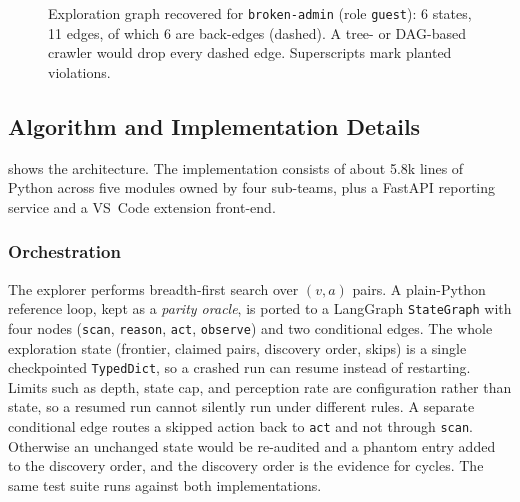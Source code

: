 \begin{figure}[t]
\centering
{}
\caption{Exploration graph recovered for \texttt{broken-admin} (role
\texttt{guest}): 6 states, 11 edges, of which 6 are back-edges (dashed). A
tree- or DAG-based crawler would drop every dashed edge. Superscripts mark
planted violations.}
\label{fig:app}
\end{figure}

\subsection{Algorithm and Implementation Details}
\label{sec:system}




 shows the architecture. The implementation consists of about
5.8k lines of Python across five modules owned by four sub-teams, plus a
FastAPI reporting service and a VS~Code extension front-end.

\subsubsection{Orchestration}
The explorer performs breadth-first search over $(v,a)$ pairs. A plain-Python
reference loop, kept as a \emph{parity oracle}, is ported to a LangGraph
\texttt{StateGraph} with four nodes (\texttt{scan}, \texttt{reason},
\texttt{act}, \texttt{observe}) and two conditional edges. The whole
exploration state (frontier, claimed pairs, discovery order, skips) is a
single checkpointed \texttt{TypedDict}, so a crashed run can resume instead of
restarting. Limits such as depth, state cap, and perception rate are
configuration rather than state, so a resumed run cannot silently run under
different rules. A separate conditional edge routes a skipped action back to
\texttt{act} and not through \texttt{scan}. Otherwise an unchanged state would
be re-audited and a phantom entry added to the discovery order, and the
discovery order is the evidence for cycles. The same test suite runs against
both implementations.

